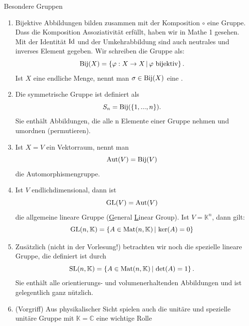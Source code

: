 \begin{Beispiel}
{Besondere Gruppen}
\begin{enumerate}
    \item Bijektive Abbildungen bilden zusammen mit der Komposition \glqq $\circ$ \grqq eine Gruppe. Dass die Komposition Assoziativität erfüllt, haben wir in Mathe 1 gesehen. Mit der Identität $\text{Id}$ und der Umkehrabbildung sind auch neutrales und inverses Element gegeben. Wir schreiben die Gruppe als:
    \begin{equation*}
        \text{Bij}(X)=\left\{\varphi : X \rightarrow X\,|\,\varphi \text{ bijektiv}\right\}.
    \end{equation*}
    Ist $X$ eine endliche Menge, nennt man $\sigma \in \text{Bij}(X)$ eine .
    \item Die symmetrische Gruppe  ist definiert als
    \begin{equation*}
        S_{n} = \text{Bij}(\{1,...,n\}).
    \end{equation*}
    Sie enthält Abbildungen, die alle n Elemente einer Gruppe nehmen und umordnen (permutieren).
    \item Ist $X=V$ ein Vektorraum, nennt man 
    \begin{equation*}
        \text{Aut}(V) = \text{Bij}(V)
    \end{equation*}
    die Automorphismengruppe.
    \item Ist $V$ endlichdimensional, dann ist 
    \begin{equation*}
        \text{GL}(V) = \text{Aut} (V)
    \end{equation*}
    die allgemeine lineare Gruppe (\underline{G}eneral \underline{L}inear Group).
    Ist $V=\mathbb{K}^{n}$, dann gilt:
    \begin{equation*}
        \text{GL}(n,\mathbb{K}) = \left\{A\in \text{Mat} (n,\mathbb{K})\,|\,\ker (A)=0\right\}
    \end{equation*}
    \item Zusätzlich (nicht in der Vorlesung!) betrachten wir noch die spezielle lineare Gruppe, die definiert ist durch
    \begin{equation*}
        \text{SL}(n,\mathbb{K}) = \left\{A\in \text{Mat} (n,\mathbb{K})\,|\,\det (A)=1\right\}.
    \end{equation*}
    Sie enthält alle orientierungs- und volumenerhaltenden Abbildungen und ist gelegentlich ganz nützlich.
    \item (Vorgriff) Aus physikalischer Sicht spielen auch die unitäre und spezielle unitäre Gruppe mit $\mathbb{K}=\mathbb{C}$ eine wichtige Rolle
    \begin{equation*}

\end{equation*}
\end{enumerate}
\end{Beispiel}
